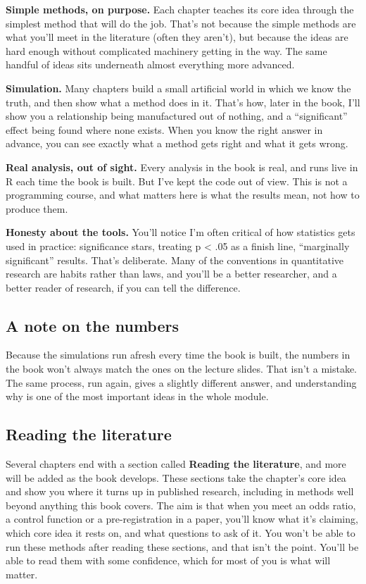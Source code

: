 \documentclass[
]{book}
\newcounter{none} %
\begin{document}
\textbf{Simple methods, on purpose.} Each chapter teaches its core idea through the simplest method that will do the job. That's not because the simple methods are what you'll meet in the literature (often they aren't), but because the ideas are hard enough without complicated machinery getting in the way. The same handful of ideas sits underneath almost everything more advanced.

\textbf{Simulation.} Many chapters build a small artificial world in which we know the truth, and then show what a method does in it. That's how, later in the book, I'll show you a relationship being manufactured out of nothing, and a ``significant'' effect being found where none exists. When you know the right answer in advance, you can see exactly what a method gets right and what it gets wrong.

\textbf{Real analysis, out of sight.} Every analysis in the book is real, and runs live in R each time the book is built. But I've kept the code out of view. This is not a programming course, and what matters here is what the results mean, not how to produce them.

\textbf{Honesty about the tools.} You'll notice I'm often critical of how statistics gets used in practice: significance stars, treating p \textless{} .05 as a finish line, ``marginally significant'' results. That's deliberate. Many of the conventions in quantitative research are habits rather than laws, and you'll be a better researcher, and a better reader of research, if you can tell the difference.

\subsection{A note on the numbers}\label{a-note-on-the-numbers}

Because the simulations run afresh every time the book is built, the numbers in the book won't always match the ones on the lecture slides. That isn't a mistake. The same process, run again, gives a slightly different answer, and understanding why is one of the most important ideas in the whole module.

\subsection{Reading the literature}\label{reading-the-literature}

Several chapters end with a section called \textbf{Reading the literature}, and more will be added as the book develops. These sections take the chapter's core idea and show you where it turns up in published research, including in methods well beyond anything this book covers. The aim is that when you meet an odds ratio, a control function or a pre-registration in a paper, you'll know what it's claiming, which core idea it rests on, and what questions to ask of it. You won't be able to run these methods after reading these sections, and that isn't the point. You'll be able to read them with some confidence, which for most of you is what will matter.
\end{document}
